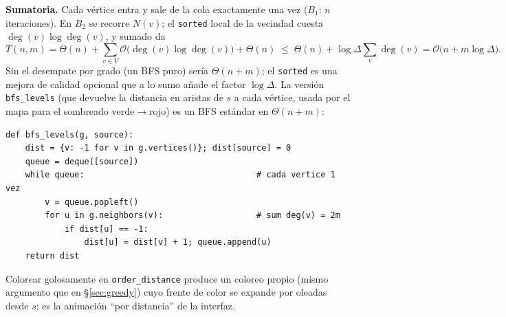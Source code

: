 \documentclass[11pt,a4paper]{article}
\theoremstyle{definition}
\theoremstyle{remark}
\newcommand{\dg}{\operatorname{deg}}
\newcommand{\bigO}{\mathcal{O}}
\begin{document}
\textbf{Sumatoria.} Cada vértice entra y sale de la cola exactamente una vez
($B_1$: $n$ iteraciones). En $B_2$ se recorre $N(v)$; el \texttt{sorted} local de
la vecindad cuesta $\dg(v)\log\dg(v)$, y sumado da
\[
T(n,m)=\Theta(n)+\sum_{v\in V}\bigO\!\big(\dg(v)\log\dg(v)\big)+\Theta(n)
\;\le\;\Theta(n)+\log\Delta\sum_{v}\dg(v)=\bigO\big(n+m\log\Delta\big).
\]
Sin el desempate por grado (un BFS puro) sería $\Theta(n+m)$; el
\texttt{sorted} es una mejora de calidad opcional que a lo sumo añade el factor
$\log\Delta$. La versión \texttt{bfs\_levels} (que devuelve la distancia en
aristas de $s$ a cada vértice, usada por el mapa para el sombreado
verde$\to$rojo) es un BFS estándar en $\Theta(n+m)$:
\begin{lstlisting}
def bfs_levels(g, source):
    dist = {v: -1 for v in g.vertices()}; dist[source] = 0
    queue = deque([source])
    while queue:                                   # cada vertice 1 vez
        v = queue.popleft()
        for u in g.neighbors(v):                   # sum deg(v) = 2m
            if dist[u] == -1:
                dist[u] = dist[v] + 1; queue.append(u)
    return dist
\end{lstlisting}
Colorear golosamente en \texttt{order\_distance} produce un coloreo propio (mismo
argumento que en \S\ref{sec:greedy}) cuyo frente de color se expande por oleadas
desde $s$: es la animación ``por distancia'' de la interfaz.

\end{document}
